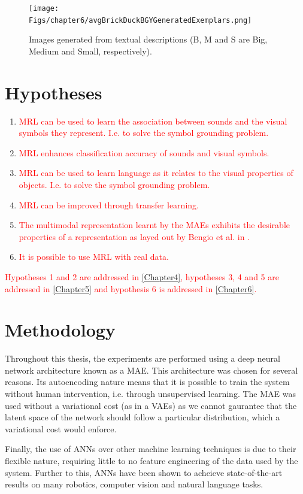 \begin{figure}
\centering

\texttt{[image: Figs/chapter6/avgBrickDuckBGYGeneratedExemplars.png]}
\caption{Images generated from textual descriptions (B, M and S are Big, Medium and Small, respectively).}
\label{fig:mrl_teaser}
\end{figure}

\section{Hypotheses}


\begin{enumerate}

	\item \textcolor{red}{\ac{MRL} can be used to learn the association between sounds and the visual symbols they represent. I.e. to solve the symbol grounding problem.}
	\item \textcolor{red}{\ac{MRL} enhances classification accuracy of sounds and visual symbols.}
	\item \textcolor{red}{\ac{MRL} can be used to learn language as it relates to the visual properties of objects. I.e. to solve the symbol grounding problem.}
	\item \textcolor{red}{\ac{MRL} can be improved through transfer learning.}
	\item \textcolor{red}{The multimodal representation learnt by the \acp{MAE} exhibits the desirable properties of a representation as layed out by Bengio et al. in \cite{repRev}.}		
	\item \textcolor{red}{It is possible to use \ac{MRL} with real data.}
	
\end{enumerate}

\textcolor{red}{Hypotheses 1 and 2 are addressed in \autoref{Chapter4}, hypotheses 3, 4 and 5 are addressed in \autoref{Chapter5} and hypothesis 6 is addressed in \autoref{Chapter6}.} 


\section{Methodology}
{Throughout this thesis, the experiments are performed using a deep neural network architecture known as a \ac{MAE}. This architecture was chosen for several reasons. Its autoencoding nature means that it is possible to train the system without human intervention, i.e. through unsupervised learning. 
The \ac{MAE} was used without a variational cost (as in a \acp{VAE}) as we cannot gaurantee that the latent space of the network should follow a particular distribution, which a variational cost would enforce.

Finally, the use of \acp{ANN} over other machine learning techniques is due to their flexible nature, requiring little to no feature engineering of the data used by the system. Further to this, \acp{ANN} have been shown to acheieve state-of-the-art results on many robotics, computer vision and natural language tasks.}

